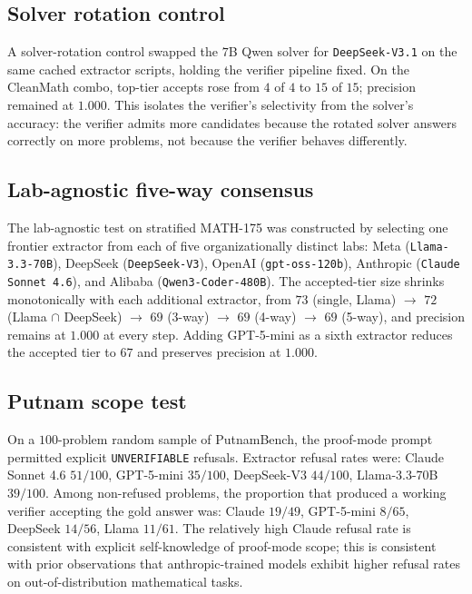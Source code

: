 \documentclass{article}
\begin{document}
\subsection{Solver rotation control}
\label{app:rotation}

A solver-rotation control swapped the $7$B Qwen solver for
\texttt{DeepSeek-V3.1} on the same cached extractor scripts, holding
the verifier pipeline fixed. On the CleanMath combo, top-tier accepts
rose from $4$ of $4$ to $15$ of $15$; precision remained at $1.000$.
This isolates the verifier's selectivity from the solver's accuracy:
the verifier admits more candidates because the rotated solver answers
correctly on more problems, not because the verifier behaves
differently.

\subsection{Lab-agnostic five-way consensus}
\label{app:fiveway}

The lab-agnostic test on stratified MATH-175 was constructed by
selecting one frontier extractor from each of five organizationally
distinct labs: Meta (\texttt{Llama-3.3-70B}), DeepSeek
(\texttt{DeepSeek-V3}), OpenAI (\texttt{gpt-oss-120b}), Anthropic
(\texttt{Claude Sonnet 4.6}), and Alibaba
(\texttt{Qwen3-Coder-480B}). The accepted-tier size shrinks
monotonically with each additional extractor, from $73$ (single,
Llama) $\to$ $72$ (Llama $\cap$ DeepSeek) $\to$ $69$ (3-way) $\to$ $69$
(4-way) $\to$ $69$ (5-way), and precision remains at $1.000$ at every
step. Adding GPT-5-mini as a sixth extractor reduces the accepted tier
to $67$ and preserves precision at $1.000$.

\subsection{Putnam scope test}
\label{app:putnam}

On a $100$-problem random sample of PutnamBench, the proof-mode prompt
permitted explicit \texttt{UNVERIFIABLE} refusals. Extractor refusal
rates were: Claude Sonnet 4.6 $51/100$, GPT-5-mini $35/100$,
DeepSeek-V3 $44/100$, Llama-3.3-70B $39/100$.
Among non-refused problems, the proportion that produced a working
verifier accepting the gold answer was: Claude $19/49$, GPT-5-mini
$8/65$, DeepSeek $14/56$, Llama $11/61$.
The relatively high Claude refusal rate is consistent with explicit
self-knowledge of proof-mode scope; this is consistent with prior
observations that anthropic-trained models exhibit higher refusal
rates on out-of-distribution mathematical tasks.
\end{document}
